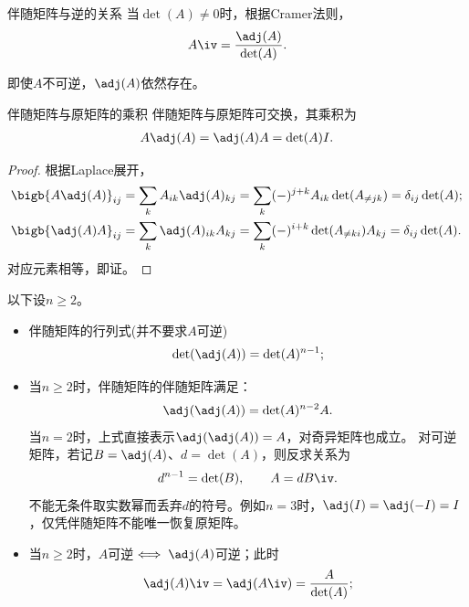 \begin{theorem}
	{伴随矩阵与逆的关系}{}
	当$\det(A)\neq0$时，根据Cramer法则，
	\begin{align}
		A\iv=\frac{\adj(A)}{\det(A)}.
	\end{align}
\end{theorem}
\begin{remark}
	即使$A$不可逆，$\adj(A)$依然存在。
\end{remark}
\begin{theorem}{伴随矩阵与原矩阵的乘积}{}
	伴随矩阵与原矩阵可交换，其乘积为
	\begin{align}
		A\adj(A)=\adj(A)A=\det(A)I.
	\end{align}
\end{theorem}
\begin{proof}
	根据Laplace展开，
	\begin{align*}
		\bigb{A\adj(A)}_{ij}&=\sum_{k}A_{ik}\adj(A)_{kj}=\sum_{k}(-)^{j+k}A_{ik}\det(A_{\neq jk})=\delta_{ij}\det(A);\\
		\bigb{\adj(A)A}_{ij}&=\sum_{k}\adj(A)_{ik}A_{kj}=\sum_{k}(-)^{i+k}\det(A_{\neq ki})A_{kj}=\delta_{ij}\det(A).%
	\end{align*}
	对应元素相等，即证。
\end{proof}
\begin{corollary}
	以下设$n\geq2$。
	\begin{itemize}
		\item %
		伴随矩阵的行列式(并不要求$A$可逆)
		\begin{align}
			\det(\adj(A))=\det(A)^{n-1};
		\end{align}
		\item 当$n\geq2$时，伴随矩阵的伴随矩阵满足：
		\begin{align}
			\adj(\adj(A))=\det(A)^{n-2}A.
		\end{align}
		当$n=2$时，上式直接表示$\adj(\adj(A))=A$，对奇异矩阵也成立。
		对可逆矩阵，若记$B=\adj(A)$、$d=\det(A)$，则反求关系为
		\[
			d^{n-1}=\det(B),\qquad A=dB\iv.
		\]
		不能无条件取实数幂而丢弃$d$的符号。例如$n=3$时，$\adj(I)=\adj(-I)=I$，仅凭伴随矩阵不能唯一恢复原矩阵。
		\item 当$n\geq2$时，$A$可逆$\iff\adj(A)$可逆；此时
		\begin{align}
			\adj(A)\iv=\adj(A\iv)=\frac{A}{\det(A)};
		\end{align}
	\end{itemize}
\end{corollary}

